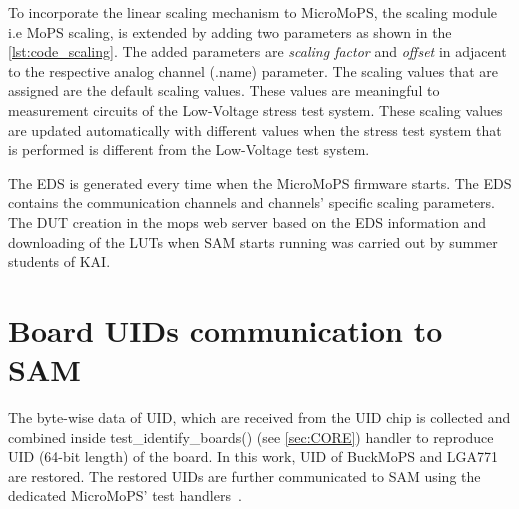 

To incorporate the linear scaling mechanism to MicroMoPS, the scaling module i.e MoPS scaling, is extended by adding two parameters as shown in the \cref{lst:code_scaling}.
The added parameters are \emph{scaling factor} and \emph{offset} in adjacent to the respective analog channel (.name) parameter.
The scaling values that are assigned are the default scaling values.
These values are meaningful to measurement circuits of the Low-Voltage stress test system.
These scaling values are updated automatically with different values when the stress test system that is performed is different from the Low-Voltage test system.

The \gls{EDS} is generated every time when the MicroMoPS firmware starts. 
The EDS contains the communication channels and channels' specific scaling parameters. 
The \acrshort{DUT} creation in the mops web server based on the EDS information and downloading of the \glspl{LUT} when SAM starts running was carried out by summer students of KAI.




\section{Board UIDs communication to SAM}
		 The byte-wise data of \gls{UID}, which are received from the \gls{UID} chip is collected and combined inside test\_identify\_boards() (see \cref{sec:CORE}) handler to reproduce UID (64-bit length) of the board. 
		 In this work, UID of BuckMoPS and LGA771 are restored.
		 The restored UIDs are further communicated to SAM using the dedicated MicroMoPS' test handlers~\cite{Steinwender2016}.

